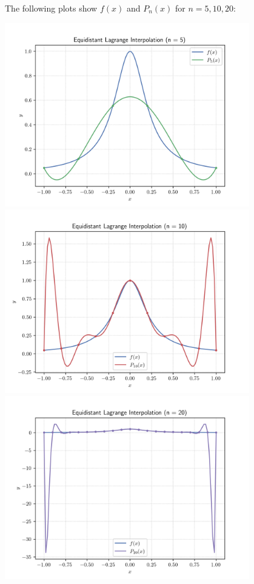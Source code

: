 \documentclass[12pt]{article}
\begin{document}
\vspace{1em}
The following plots show $f(x)$ and $P_n(x)$ for $n=5, 10, 20$:
\begin{center}
    \includegraphics[width=0.8\textwidth]{../plots_2/q2_2/p5.png}
    \includegraphics[width=0.8\textwidth]{../plots_2/q2_2/p10.png}
    \includegraphics[width=0.8\textwidth]{../plots_2/q2_2/p20.png}

\end{center}
\end{document}
